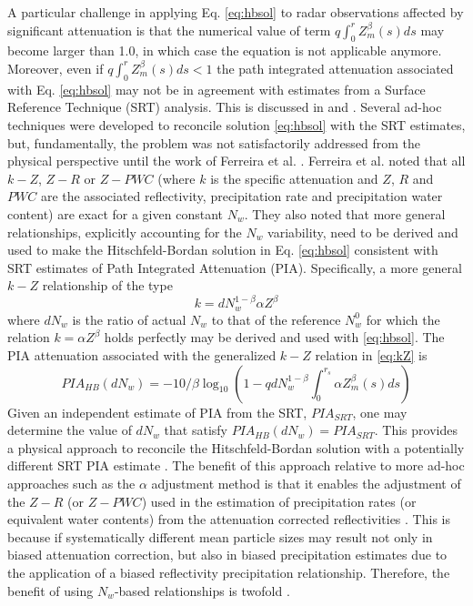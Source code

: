 \documentclass[10pt]{ietbook}
\begin{document}
A particular challenge in applying Eq. \ref{eq:hbsol} to radar observations affected by significant attenuation is
that the numerical value of term $q\int_0^r Z_m^\beta(s)ds$ may become larger than 1.0, in which case the equation
is not applicable anymore. Moreover, even if $q\int_0^r Z_m^\beta(s)ds<1$ the path integrated attenuation associated
with Eq. \ref{eq:hbsol} may not be in agreement with estimates from a Surface Reference Technique (SRT) analysis.  This
is discussed in \cite{marzoug1991} and \cite{iguchi_meneghini_1994}.  Several ad-hoc techniques were developed to 
reconcile solution \ref{eq:hbsol} with the SRT estimates, but, fundamentally, the problem was not satisfactorily 
addressed from the physical perspective until the work of Ferreira et al. \cite{ferreira2001}. 
Ferreira et al. \cite{ferreira2001} noted that all $k-Z$, $Z-R$ or $Z-PWC$ (where $k$ is the specific attenuation
and $Z$, $R$ and $PWC$ are the associated reflectivity, precipitation rate and precipitation water content) are 
exact for a given constant $N_w$.  They also noted that more general relationships, explicitly accounting for the $N_w$
variability, need to be derived and used to make the Hitschfeld-Bordan 
solution in Eq. \ref{eq:hbsol} consistent with SRT estimates of Path Integrated Attenuation (PIA).  Specifically,
a more general $k-Z$ relationship of the type
\begin{equation} \label{eq:kZ}
k=dN_w^{1-\beta} \alpha Z^{\beta}
\end{equation}
where $dN_w$ is the ratio of actual $N_w$ to that of the reference $N_{w}^0$ for which the relation $k=\alpha Z^{\beta}$ 
holds perfectly may be derived and used with \ref{eq:hbsol}.  The PIA attenuation associated with the generalized 
$k-Z$ relation in  \ref{eq:kZ} is
\begin{equation} \label{eq:PIA}
PIA_{HB}(dN_w)=-10/\beta \log_{10}(1-q dN_w^{1-\beta} \int_0^{r_s}\alpha Z_m^\beta(s)ds)
\end{equation}
Given an independent estimate of PIA from the SRT, $PIA_{SRT}$, one may determine the value of $dN_w$ that satisfy
$PIA_{HB}(dN_w)=PIA_{SRT}$.  This provides a physical approach to reconcile the Hitschfeld-Bordan solution with a potentially
different SRT PIA estimate \cite{ferreira2001}.  The benefit of this approach relative to more ad-hoc approaches such
as the $\alpha$ adjustment method \cite{iguchi_meneghini_1994} is that it enables the adjustment of the $Z-R$ 
(or $Z-PWC$) used in the estimation of precipitation rates (or equivalent water contents) from the attenuation corrected
reflectivities \cite{ferreira2001}. This is because if systematically different mean particle sizes may result not only
in biased attenuation correction,  but also in biased precipitation estimates due to the application of a biased reflectivity
precipitation relationship.  Therefore, the benefit of using $N_w$-based relationships is twofold \cite{ferreira2001}.
\end{document}
